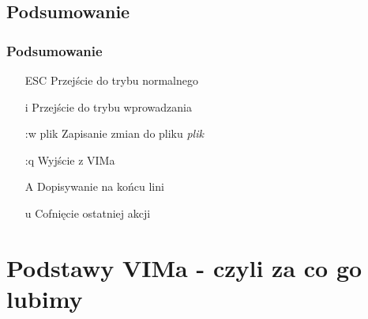 \documentclass{beamer}
\begin{document}
\subsection{Podsumowanie}
\begin{frame}
	\frametitle{Podsumowanie}
	\begin{enumerate}
		\item [ESC] Przejście do trybu normalnego
		\item [i] Przejście do trybu wprowadzania
		\item [:w plik] Zapisanie zmian do pliku \textit{plik}
		\item [:q] Wyjście z VIMa
		\item [A] Dopisywanie na końcu lini
		\item [u] Cofnięcie ostatniej akcji
	\end{enumerate}
\end{frame}
\section{Podstawy VIMa - czyli za co go lubimy}
\end{document}
